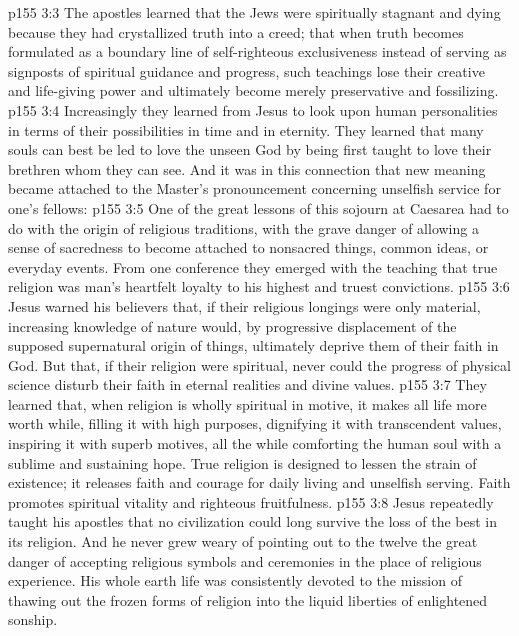 \vs p155 3:3 The apostles learned that the Jews were spiritually stagnant and dying because they had crystallized truth into a creed; that when truth becomes formulated as a boundary line of self\hyp{}righteous exclusiveness instead of serving as signposts of spiritual guidance and progress, such teachings lose their creative and life\hyp{}giving power and ultimately become merely preservative and fossilizing.
\vs p155 3:4 Increasingly they learned from Jesus to look upon human personalities in terms of their possibilities in time and in eternity. They learned that many souls can best be led to love the unseen God by being first taught to love their brethren whom they can see. And it was in this connection that new meaning became attached to the Master’s pronouncement concerning unselfish service for one’s fellows: 
\vs p155 3:5 One of the great lessons of this sojourn at Caesarea had to do with the origin of religious traditions, with the grave danger of allowing a sense of sacredness to become attached to nonsacred things, common ideas, or everyday events. From one conference they emerged with the teaching that true religion was man’s heartfelt loyalty to his highest and truest convictions.
\vs p155 3:6 Jesus warned his believers that, if their religious longings were only material, increasing knowledge of nature would, by progressive displacement of the supposed supernatural origin of things, ultimately deprive them of their faith in God. But that, if their religion were spiritual, never could the progress of physical science disturb their faith in eternal realities and divine values.
\vs p155 3:7 They learned that, when religion is wholly spiritual in motive, it makes all life more worth while, filling it with high purposes, dignifying it with transcendent values, inspiring it with superb motives, all the while comforting the human soul with a sublime and sustaining hope. True religion is designed to lessen the strain of existence; it releases faith and courage for daily living and unselfish serving. Faith promotes spiritual vitality and righteous fruitfulness.
\vs p155 3:8 Jesus repeatedly taught his apostles that no civilization could long survive the loss of the best in its religion. And he never grew weary of pointing out to the twelve the great danger of accepting religious symbols and ceremonies in the place of religious experience. His whole earth life was consistently devoted to the mission of thawing out the frozen forms of religion into the liquid liberties of enlightened sonship.
